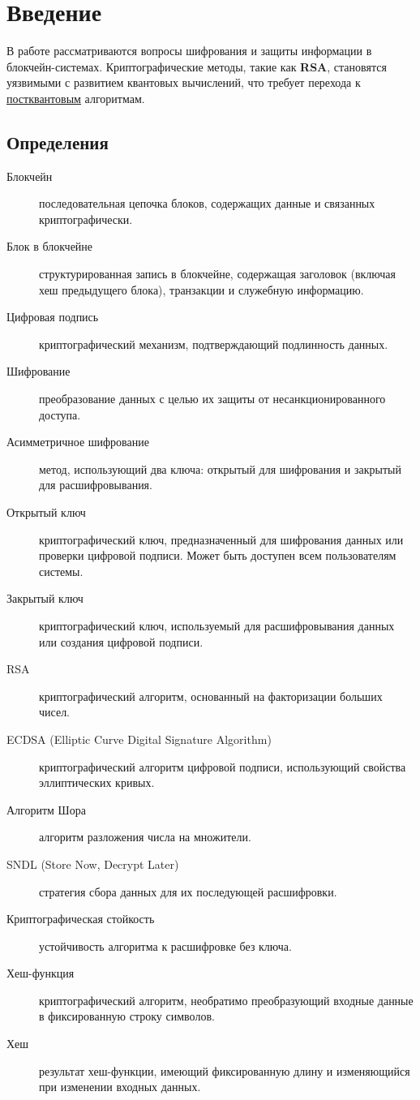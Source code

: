 \documentclass[a4paper]{article}
\begin{document}
\section{Введение}
В работе рассматриваются вопросы шифрования и защиты информации в блокчейн-системах. 
Криптографические методы, такие как \textbf{RSA}, становятся уязвимыми с развитием квантовых вычислений, 
что требует перехода к \underline{постквантовым} алгоритмам.

\subsection{Определения}
\begin{description}
    \item[Блокчейн] последовательная цепочка блоков, содержащих данные и связанных криптографически.
    \item[Блок в блокчейне] структурированная запись в блокчейне, содержащая заголовок (включая хеш предыдущего блока), транзакции и служебную информацию.
    \item[Цифровая подпись] криптографический механизм, подтверждающий подлинность данных.
    \item[Шифрование] преобразование данных с целью их защиты от несанкционированного доступа.
    \item[Асимметричное шифрование] метод, использующий два ключа: открытый для шифрования и закрытый для расшифровывания. %
    \item[Открытый ключ] криптографический ключ, предназначенный для шифрования данных или проверки цифровой подписи. Может быть доступен всем пользователям системы.  
    \item[Закрытый ключ] криптографический ключ, используемый для расшифровывания данных или создания цифровой подписи.
    \item[RSA] криптографический алгоритм, основанный на факторизации больших чисел.
    \item[ECDSA (Elliptic Curve Digital Signature Algorithm)] криптографический алгоритм цифровой подписи, использующий свойства эллиптических кривых.
    \item[Алгоритм Шора] алгоритм разложения числа на множители.
    \item[SNDL (Store Now, Decrypt Later)] стратегия сбора данных для их последующей расшифровки.
    \item[Криптографическая стойкость] устойчивость алгоритма к расшифровке без ключа.
    \item[Хеш-функция] криптографический алгоритм, необратимо преобразующий входные данные в фиксированную строку символов.
    \item[Хеш] результат хеш-функции, имеющий фиксированную длину и изменяющийся при изменении входных данных. %
\end{description}
\end{document}
